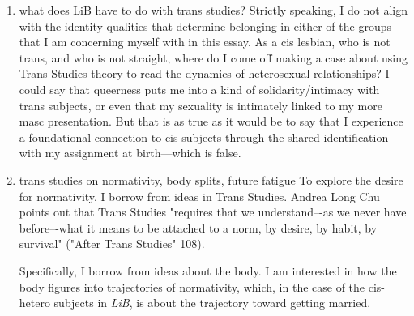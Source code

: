 \documentclass[11pt]{article}
\begin{document}
\begin{enumerate}
\begin{enumerate}
\item future is postive, becomes negative/bleak
\label{sec:org4c5e331}
In pods, the future is positive:
\begin{itemize}
\item The future with you, it's gonna be tenfold.
\item The future togetherness is gonna be great.
\item The future with her, she's gonna be there forever.
\end{itemize}

Postpods, the future is more negative:
\begin{itemize}
\item The future looks pretty bleak. (repeated)
\item The future has been absolutely horrible.
\end{itemize}
\end{enumerate}

\item what does LiB have to do with trans studies?
\label{sec:orgb707fb6}
Strictly speaking, I do not align with the identity qualities that
determine belonging in either of the groups that I am concerning
myself with in this essay. As a cis lesbian, who is not trans, and who
is not straight, where do I come off making a case about using Trans
Studies theory to read the dynamics of heterosexual relationships? I
could say that queerness puts me into a kind of solidarity/intimacy
with trans subjects, or even that my sexuality is intimately linked to
my more masc presentation. But that is as true as it would be to say
that I experience a foundational connection to cis subjects through
the shared identification with my assignment at birth---which is
false.

\item trans studies on normativity, body splits, future fatigue
\label{sec:org68c9660}
To explore the desire for normativity, I borrow from ideas in Trans
Studies. Andrea Long Chu points out that Trans Studies "requires that
we understand–-as we never have before–-what it means to be attached
to a norm, by desire, by habit, by survival" ("After Trans Studies"
108).

Specifically, I borrow from ideas about the body. I am interested in
how the body figures into trajectories of normativity, which, in the
case of the cis-hetero subjects in \emph{LiB}, is about the trajectory
toward getting married.




\end{enumerate}
\end{document}
